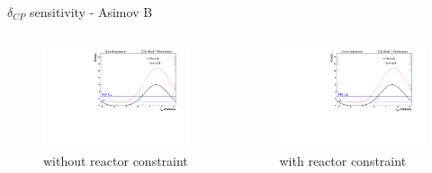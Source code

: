 \documentclass{beamer}
\newcommand{\deltacp}{$\delta_{CP}$\xspace}
\begin{document}
\begin{frame}{\deltacp sensitivity - Asimov B}
	\centering
	\begin{columns}
		\begin{column}{0.5\paperwidth}
			\begin{figure}
				\includegraphics[trim={0cm 0cm 0cm 0cm}, clip, scale=0.33] {images/sensitivity/dcp_global_t2k}
				\caption*{without reactor constraint}
			\end{figure}
		\end{column}
		\begin{column}{0.5\paperwidth}
			\begin{figure}
				\includegraphics[trim={0cm 0cm 0cm 0cm}, clip, scale=0.33] {images/sensitivity/dcp_global_t2k}
				\caption*{with reactor constraint}
			\end{figure}
		\end{column}
	\end{columns}
\end{frame}
\end{document}
